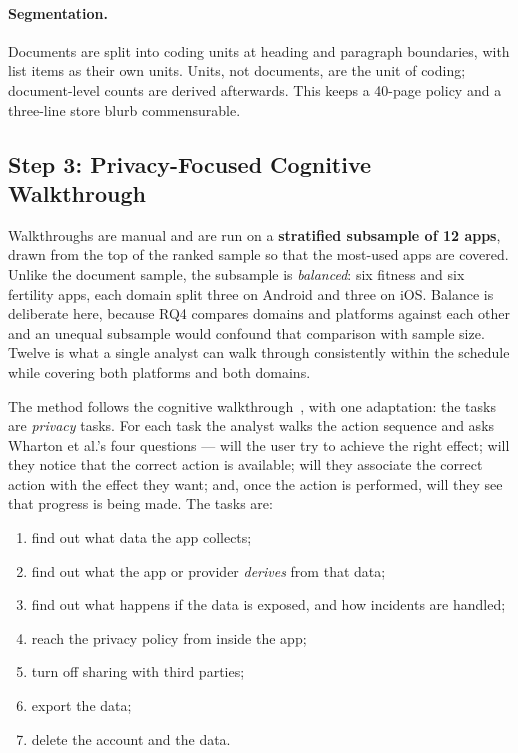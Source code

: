 \paragraph{Segmentation.}
Documents are split into coding units at heading and paragraph boundaries, with
list items as their own units. Units, not documents, are the unit of coding;
document-level counts are derived afterwards. This keeps a 40-page policy and a
three-line store blurb commensurable.

\subsection{Step 3: Privacy-Focused Cognitive Walkthrough}
\label{sec:walkthrough}

Walkthroughs are manual and are run on a \textbf{stratified subsample of 12
apps}, drawn from the top of the ranked sample so that the most-used apps are
covered. Unlike the document sample, the subsample is \emph{balanced}: six
fitness and six fertility apps, each domain split three on Android and three on
iOS. Balance is deliberate here, because RQ4 compares domains and platforms
against each other and an unequal subsample would confound that comparison with
sample size. Twelve is what a single analyst can walk through consistently
within the schedule while covering both platforms and both domains.

The method follows the cognitive walkthrough~\parencite{wharton1994cognitive},
with one adaptation: the tasks are \emph{privacy} tasks. For each task the
analyst walks the action sequence and asks Wharton et al.'s four questions ---
will the user try to achieve the right effect; will they notice that the correct
action is available; will they associate the correct action with the effect they
want; and, once the action is performed, will they see that progress is being
made. The tasks are:

\begin{enumerate}[leftmargin=*,itemsep=1pt]
  \item find out what data the app collects;
  \item find out what the app or provider \emph{derives} from that data;
  \item find out what happens if the data is exposed, and how incidents are
        handled;
  \item reach the privacy policy from inside the app;
  \item turn off sharing with third parties;
  \item export the data;
  \item delete the account and the data.
\end{enumerate}

